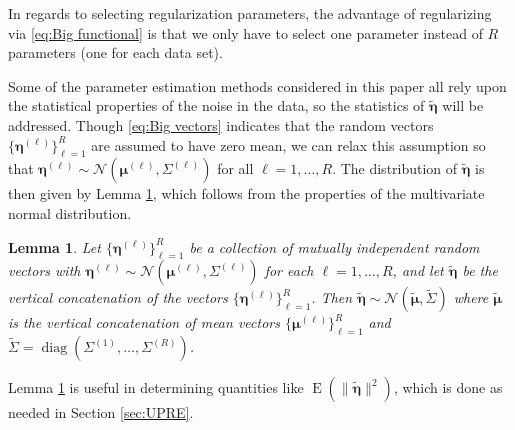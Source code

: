 \documentclass[12pt]{article}
\newcommand{\trans}[1]{{#1}^\mathsf{T}}	%
\DeclareMathOperator{\diag}{diag}	%
\newcommand{\noise}{\eta}	%
\newcommand{\noiseVec}{\bm{\noise}}	%
\DeclareMathOperator{\E}{E}	%
\newtheorem{lemma}{Lemma}[section]
\begin{document}
In regards to selecting regularization parameters, the advantage of regularizing via \eqref{eq:Big functional} is that we only have to select one parameter instead of $R$ parameters (one for each data set). \par 
Some of the parameter estimation methods considered in this paper all rely upon the statistical properties of the noise in the data, so the statistics of $\widetilde{\noiseVec}$ will be addressed. Though \eqref{eq:Big vectors} indicates that the random vectors $\{\noiseVec^{(\ell)}\}_{\ell=1}^R$ are assumed to have zero mean, we can relax this assumption so that $\noiseVec^{(\ell)} \sim \mathcal{N}(\bm{\mu}^{(\ell)},\Sigma^{(\ell)})$ for all $\ell = 1,\ldots,R$. The distribution of $\widetilde{\noiseVec}$ is then given by Lemma \ref{lem:Concatenation of Normal Noise}, which follows from the properties of the multivariate normal distribution. 
\begin{lemma}
\label{lem:Concatenation of Normal Noise}
Let $\{\noiseVec^{(\ell)}\}_{\ell=1}^R$ be a collection of mutually independent random vectors with $\noiseVec^{(\ell)} \sim \mathcal{N}(\bm{\mu}^{(\ell)},\Sigma^{(\ell)})$ for each $\ell = 1,\ldots,R$, and let $\widetilde{\noiseVec}$ be the vertical concatenation of the vectors $\{\noiseVec^{(\ell)}\}_{\ell=1}^R$. Then $\widetilde{\noiseVec} \sim \mathcal{N}(\widetilde{\bm{\mu}},\widetilde{\Sigma})$ where $\widetilde{\bm{\mu}}$ is the vertical concatenation of mean vectors $\{\bm{\mu}^{(\ell)}\}_{\ell=1}^R$ and $\widetilde{\Sigma} = \diag(\Sigma^{(1)},\ldots,\Sigma^{(R)})$.
\end{lemma}
\noindent Lemma \ref{lem:Concatenation of Normal Noise} is useful in determining quantities like $\E(\|\widetilde{\noiseVec}\|^2)$, which is done as needed in Section \ref{sec:UPRE}.
\end{document}
